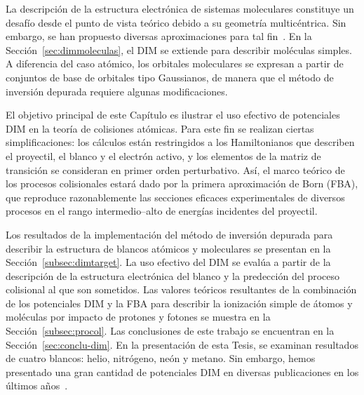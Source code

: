 La descripción de la estructura electrónica de sistemas moleculares 
constituye un desafío desde el punto de vista teórico debido a su 
geometría multicéntrica. Sin embargo, se han propuesto diversas 
aproximaciones para tal fin~\cite{Helgaker:00,Schaefer:04}. En la 
Sección~\ref{sec:dimmoleculas}, el DIM se extiende para describir 
moléculas simples. A diferencia del caso atómico, los orbitales 
moleculares se expresan a partir de conjuntos de base de orbitales tipo 
Gaussianos, de manera que el método de inversión depurada requiere 
algunas modificaciones.

El objetivo principal de este Capítulo es ilustrar el uso efectivo de 
potenciales DIM en la teoría de colisiones atómicas. Para este fin 
se realizan ciertas simplificaciones: los cálculos están restringidos a 
los Hamiltonianos que describen el proyectil, el blanco y el electrón 
activo, y los elementos de la matriz de transición se consideran en 
primer orden perturbativo. 
Así, el marco teórico de los procesos colisionales estará dado por la 
primera aproximación de Born (FBA), que reproduce razonablemente las 
secciones eficaces experimentales de diversos procesos en el rango 
intermedio--alto de energías incidentes del proyectil. 

Los resultados de la implementación del método de inversión depurada 
para describir la estructura de blancos atómicos y moleculares se 
presentan en la Sección~\ref{subsec:dimtarget}. La uso efectivo del DIM 
se evalúa a partir de la descripción de la estructura electrónica del 
blanco y la predección del proceso colisional al que son sometidos. Las 
valores teóricos resultantes de la combinación de los 
potenciales DIM y la FBA para describir la ionización simple de átomos y 
moléculas por impacto de protones y fotones se muestra en la 
Sección~\ref{subsec:procol}. Las conclusiones de este trabajo se 
encuentran en la Sección~\ref{sec:conclu-dim}. En la presentación de 
esta Tesis, se examinan resultados de cuatro blancos: helio, nitrógeno, 
neón y metano. Sin embargo, hemos presentado una gran cantidad de 
potenciales DIM en diversas publicaciones en los últimos 
años~\cite{Mendez:16,Mendez:19dim,Mendez:18}. 

